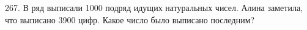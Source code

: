 267. В ряд выписали 1000 подряд идущих натуральных чисел. Алина заметила, что выписано 3900 цифр. Какое число было выписано последним?\\
